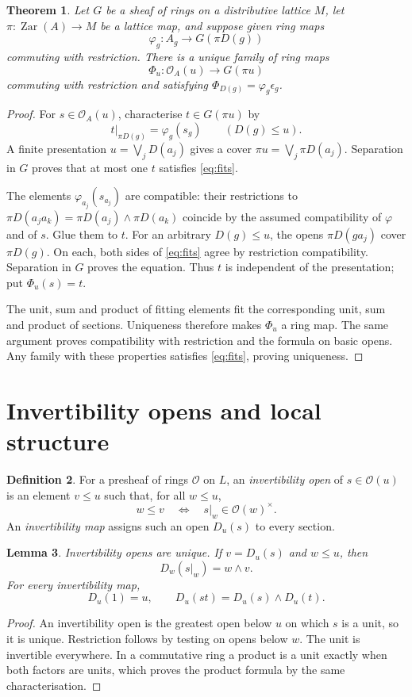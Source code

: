 \documentclass[11pt]{amsart}
\newtheorem{theorem}{Theorem}[section]
\newtheorem{lemma}[theorem]{Lemma}
\theoremstyle{definition}
\newtheorem{definition}[theorem]{Definition}
\theoremstyle{remark}
\newcommand{\Zar}{\operatorname{Zar}}
\newcommand{\OO}{\mathcal O}
\newcommand{\units}[1]{#1^{\times}}
\newcommand{\restr}[2]{#1|_{#2}}
\begin{document}
\begin{theorem}\label{thm:extension}
Let $G$ be a sheaf of rings on a distributive lattice $M$, let
$\pi:\Zar(A)\to M$ be a lattice map, and suppose given ring maps
\[
 \varphi_g:A_g\longrightarrow G(\pi D(g))
\]
commuting with restriction. There is a unique family of ring maps
\[
 \Phi_u:\OO_A(u)\longrightarrow G(\pi u)
\]
commuting with restriction and satisfying
$\Phi_{D(g)}=\varphi_g\epsilon_g$.
\end{theorem}
\begin{proof}
For $s\in\OO_A(u)$, characterise $t\in G(\pi u)$ by
\begin{equation}\label{eq:fits}
 \restr{t}{\pi D(g)}=\varphi_g(s_g)\qquad(D(g)\leq u).
\end{equation}
A finite presentation $u=\bigvee_jD(a_j)$ gives a cover
$\pi u=\bigvee_j\pi D(a_j)$. Separation in $G$ proves that at most one
$t$ satisfies \eqref{eq:fits}.

The elements $\varphi_{a_j}(s_{a_j})$ are compatible: their restrictions
to $\pi D(a_ja_k)=\pi D(a_j)\wedge\pi D(a_k)$ coincide by the assumed
compatibility of $\varphi$ and of $s$. Glue them to $t$.
For an arbitrary $D(g)\leq u$, the opens $\pi D(ga_j)$ cover
$\pi D(g)$. On each, both sides of \eqref{eq:fits} agree by restriction
compatibility. Separation in $G$ proves the equation. Thus $t$ is
independent of the presentation; put $\Phi_u(s)=t$.

The unit, sum and product of fitting elements fit the corresponding
unit, sum and product of sections. Uniqueness therefore makes $\Phi_u$
a ring map. The same argument proves compatibility with restriction and
the formula on basic opens. Any family with these properties satisfies
\eqref{eq:fits}, proving uniqueness.
\end{proof}

\section{Invertibility opens and local structure}

\begin{definition}
For a presheaf of rings $\OO$ on $L$, an \emph{invertibility open} of
$s\in\OO(u)$ is an element $v\leq u$ such that, for all $w\leq u$,
\[
 w\leq v\quad\Longleftrightarrow\quad \restr{s}{w}\in\units{\OO(w)}.
\]
An \emph{invertibility map} assigns such an open $D_u(s)$ to every
section.
\end{definition}

\begin{lemma}\label{lem:inv}
Invertibility opens are unique. If $v=D_u(s)$ and $w\leq u$, then
\[
 D_w(\restr{s}{w})=w\wedge v.
\]
For every invertibility map,
\[
 D_u(1)=u,\qquad D_u(st)=D_u(s)\wedge D_u(t).
\]
\end{lemma}
\begin{proof}
An invertibility open is the greatest open below $u$ on which $s$ is a
unit, so it is unique. Restriction follows by testing on opens below
$w$. The unit is invertible everywhere. In a commutative ring a product
is a unit exactly when both factors are units, which proves the product
formula by the same characterisation.
\end{proof}
\end{document}
